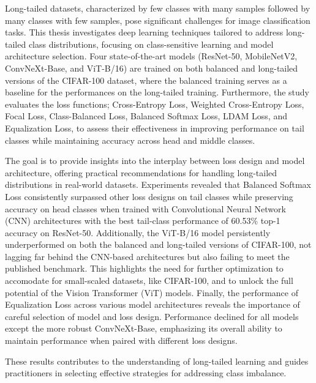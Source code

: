Long-tailed datasets, characterized by few classes with many samples followed by many classes with few samples, pose significant challenges for image classification tasks. This thesis investigates deep learning techniques tailored to address long-tailed class distributions, focusing on class-sensitive learning and model architecture selection. Four state-of-the-art models (ResNet-50, MobileNetV2, ConvNeXt-Base, and ViT-B/16) are trained on both balanced and long-tailed versions of the CIFAR-100 dataset, where the balanced training serves as a baseline for the performances on the long-tailed training. Furthermore, the study evaluates the loss functions; Cross-Entropy Loss, Weighted Cross-Entropy Loss, Focal Loss, Class-Balanced Loss, Balanced Softmax Loss, LDAM Loss, and Equalization Loss, to assess their effectiveness in improving performance on tail classes while maintaining accuracy across head and middle classes. 

The goal is to provide insights into the interplay between loss design and model architecture, offering practical recommendations for handling long-tailed distributions in real-world datasets. Experiments revealed that Balanced Softmax Loss consistently surpassed other loss designs on tail classes while preserving accuracy on head classes when trained with Convolutional Neural Network (CNN) architectures with the best tail-class performance of 60.53\% top-1 accuracy on ResNet-50. Additionally, the ViT-B/16 model persistently underperformed on both the balanced and long-tailed versions of CIFAR-100, not lagging far behind the CNN-based architectures but also failing to meet the published benchmark. This highlights the need for further optimization to accomodate for small-scaled datasets, like CIFAR-100, and to unlock the full potential of the Vision Transformer (ViT) models. Finally, the performance of Equalization Loss across various model architectures reveals the importance of careful selection of model and loss design. Performance declined for all models except the more robust ConvNeXt-Base, emphasizing its overall ability to maintain performance when paired with different loss designs.

These results contributes to the understanding of long-tailed learning and guides practitioners in selecting effective strategies for addressing class imbalance.

